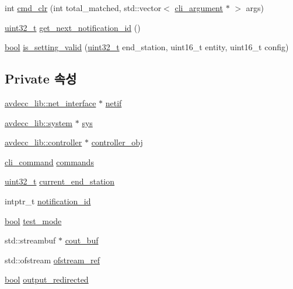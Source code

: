 \begin{DoxyCompactItemize}
int \hyperlink{classcmd__line_a1746d131e0b1e5c83ea12263d2ec673c}{cmd\+\_\+clr} (int total\+\_\+matched, std\+::vector$<$ \hyperlink{classcli__argument}{cli\+\_\+argument} $\ast$ $>$ args)
\item 
\hyperlink{parse_8c_a6eb1e68cc391dd753bc8ce896dbb8315}{uint32\+\_\+t} \hyperlink{classcmd__line_a57486218387d1aa9d262eb7c176154ad}{get\+\_\+next\+\_\+notification\+\_\+id} ()
\item 
\hyperlink{avb__gptp_8h_af6a258d8f3ee5206d682d799316314b1}{bool} \hyperlink{classcmd__line_a52a88a9e3c1e1e6fea1865df944e3443}{is\+\_\+setting\+\_\+valid} (\hyperlink{parse_8c_a6eb1e68cc391dd753bc8ce896dbb8315}{uint32\+\_\+t} end\+\_\+station, uint16\+\_\+t entity, uint16\+\_\+t config)
\end{DoxyCompactItemize}
\subsection*{Private 속성}
\begin{DoxyCompactItemize}
\item 
\hyperlink{classavdecc__lib_1_1net__interface}{avdecc\+\_\+lib\+::net\+\_\+interface} $\ast$ \hyperlink{classcmd__line_a4ec0982fdb42fd40e3eba96b9a847471}{netif}
\item 
\hyperlink{classavdecc__lib_1_1system}{avdecc\+\_\+lib\+::system} $\ast$ \hyperlink{classcmd__line_a485db4800e331cb4052c447fdf5d154e}{sys}
\item 
\hyperlink{classavdecc__lib_1_1controller}{avdecc\+\_\+lib\+::controller} $\ast$ \hyperlink{classcmd__line_af0a7784509e5bf1210a2aa19cea5df70}{controller\+\_\+obj}
\item 
\hyperlink{classcli__command}{cli\+\_\+command} \hyperlink{classcmd__line_ae4fea670c2fdd2b60f7b5b6ad6fbaf1e}{commands}
\item 
\hyperlink{parse_8c_a6eb1e68cc391dd753bc8ce896dbb8315}{uint32\+\_\+t} \hyperlink{classcmd__line_a67c43393f654ad7bc5c7caf29634cede}{current\+\_\+end\+\_\+station}
\item 
intptr\+\_\+t \hyperlink{classcmd__line_aac6422549eb9ba4b722bf21a0a401718}{notification\+\_\+id}
\item 
\hyperlink{avb__gptp_8h_af6a258d8f3ee5206d682d799316314b1}{bool} \hyperlink{classcmd__line_a07c66893ce868671f9998dad80094cb1}{test\+\_\+mode}
\item 
std\+::streambuf $\ast$ \hyperlink{classcmd__line_a4577b8eb2d0b1e99d72ef9a40e6c8d01}{cout\+\_\+buf}
\item 
std\+::ofstream \hyperlink{classcmd__line_a8ecbb7e6f42fc1b6d974b169f0baa229}{ofstream\+\_\+ref}
\item 
\hyperlink{avb__gptp_8h_af6a258d8f3ee5206d682d799316314b1}{bool} \hyperlink{classcmd__line_a4145a9821510d9b30d980e665d9bd68e}{output\+\_\+redirected}
\end{DoxyCompactItemize}


